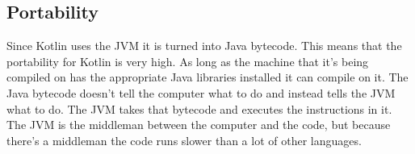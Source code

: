 \begin{center}
\section{Portability}
\end{center}

Since Kotlin uses the JVM it is turned into Java bytecode. This means that the portability for Kotlin is very high. As long as the machine that it's being compiled on has the appropriate Java libraries installed it can compile on it. The Java bytecode doesn't tell the computer what to do and instead tells the JVM what to do. The JVM takes that bytecode and executes the instructions in it. The JVM is the middleman between the computer and the code, but because there's a middleman  the code runs slower than a lot of other languages. 